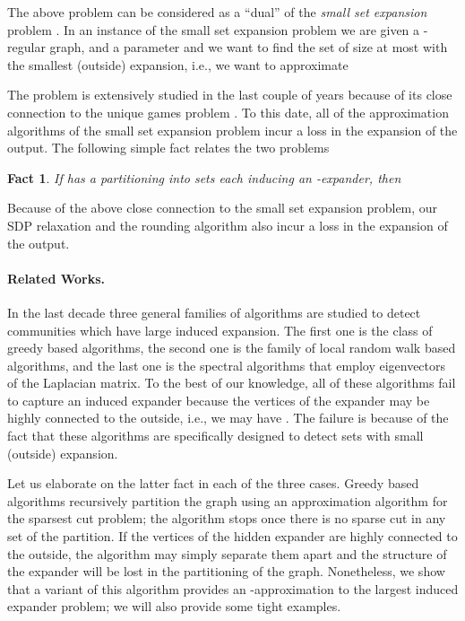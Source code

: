 \documentclass[11pt]{article}
\newtheorem{fact}[theorem]{Fact}
\begin{document}
The above problem can be considered as a ``dual'' of the \emph{small set expansion} problem \cite{RS10}. In an instance of the small set expansion problem we are given a -regular graph, and a parameter  and we want to find the set  of size at most  with the smallest (outside) expansion, i.e., we want to approximate 

The problem is extensively studied in the last couple of years because of its close connection to the unique games problem \cite{RST10,BFKM11,OT12,KL12}. To this date, all of the  approximation algorithms of the small set expansion problem incur a loss  in the expansion of the output. The following simple fact relates the two problems
\begin{fact}
	If  has a partitioning into  sets each inducing an -expander,  then 
	
\end{fact}
Because of the above close connection to the small set expansion problem, our SDP relaxation and the rounding algorithm also incur a  loss in the expansion of the output.

\paragraph{Related Works.}
In the last decade three general families of algorithms are studied to detect communities which have large induced expansion. The first one is the class of  greedy based algorithms, the second one is the family of local random walk based algorithms, and the last one is the  spectral algorithms that employ eigenvectors of the Laplacian matrix. To the best of our knowledge, all of these algorithms  fail to capture an induced expander because the vertices of the expander may be highly connected to the outside, i.e., we may have .
The failure is because of the fact that these algorithms are specifically designed to detect sets with small (outside) expansion.

Let us elaborate on the latter fact in each of the three cases. Greedy based algorithms \cite{KVV04,Tre05,AO14} recursively partition the graph using an approximation algorithm for the sparsest cut problem; the algorithm stops once there is no sparse cut in any set of the partition. If the vertices of the hidden expander are highly connected to the outside, the algorithm may simply separate them apart and the structure of the expander will be lost in the partitioning of the graph. Nonetheless, we show that a variant of this algorithm provides an -approximation to the largest induced expander problem; we will also provide some tight examples.
\end{document}
